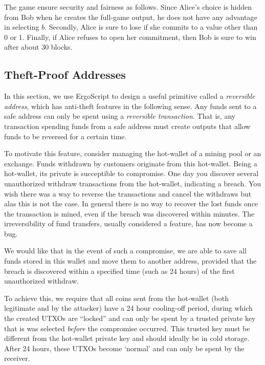 \documentclass[11pt]{article}
\newcommand{\authnote}[2]{\marginpar{\parbox{\marginparwidth}{\tiny %
  \textsf{#1 {\textcolor{blue}{notes: #2}}}}}%
  \textcolor{blue}{\textbf{\dag}}}
\newcommand{\authnote}[2]{
  \textsf{#1 \textcolor{blue}{: #2}}}
\newcommand{\authnote}[2]{}
\newcommand{\snote}[1]{{\authnote{\textcolor{yellow}{Scalahub notes}}{#1}}}
\newcommand{\langname}{ErgoScript\xspace}
\begin{document}
The game ensure security and fairness as follows. Since Alice's choice is hidden from Bob when he creates the full-game output, he does not have any advantage in selecting $b$. Secondly, Alice is sure to lose if she commits to a value other than 0 or 1. Finally, if Alice refuses to open her commitment, then Bob is sure to win after about 30 blocks. 


\subsection{Theft-Proof Addresses}

In this section, we use \langname to design a useful primitive called a {\em reversible address}, which has anti-theft features in the following sense.
Any funds sent to a safe address can only be spent using a {\em reversible transaction}. That is, any transaction spending funds from a safe address must create outputs that allow funds to be reversed for a certain time. 

To motivate this feature, consider managing the hot-wallet of a mining pool or an exchange. Funds withdrawn by customers originate from this hot-wallet. Being a hot-wallet, its private is succeptible to compromise. One day you discover several unauthorized withdraw transactions from the hot-wallet, indicating a breach. You wish there was a way to reverse the transactions and cancel the withdraws but alas this is not the case. In general there is no way to recover the lost funds once the transaction is mined, even if the breach was discovered within minutes. The irreversibility of fund transfers, usually considered a feature, has now become a bug.

We would like that in the event of such a compromise, we are able to save all funds stored in this wallet and move them to another address, provided that the breach is discovered within a specified time (such as 24 hours) of the first unauthorized withdraw. 

To achieve this, we require that all coins sent from the hot-wallet (both legitimate and by the attacker)
have a 24 hour cooling-off period, during which the created UTXOs are ``locked'' and can only be spent by a trusted private key that is was selected {\em before} the compromise occurred. This trusted key must be different from the hot-wallet private key and should ideally be in cold storage. 
After 24 hours, these UTXOs become `normal' and can only be spent by the receiver.
\end{document}
